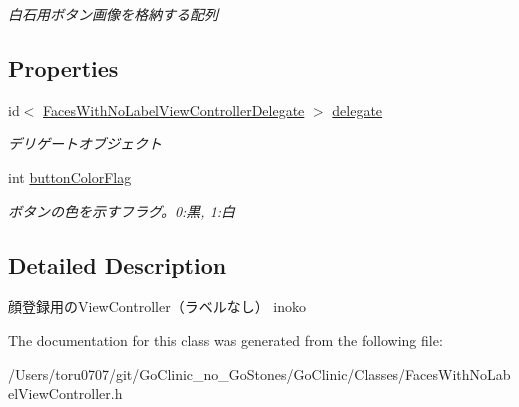 \begin{DoxyCompactItemize}
\begin{DoxyCompactList}\small\item\em 白石用ボタン画像を格納する配列 \end{DoxyCompactList}\end{DoxyCompactItemize}
\subsection*{Properties}
\begin{DoxyCompactItemize}
\item 
\hypertarget{interface_faces_with_no_label_view_controller_a7478381f8f326f2aed24674dfc976e2b}{
id$<$ \hyperlink{protocol_faces_with_no_label_view_controller_delegate-p}{FacesWithNoLabelViewControllerDelegate} $>$ \hyperlink{interface_faces_with_no_label_view_controller_a7478381f8f326f2aed24674dfc976e2b}{delegate}}
\label{interface_faces_with_no_label_view_controller_a7478381f8f326f2aed24674dfc976e2b}

\begin{DoxyCompactList}\small\item\em デリゲートオブジェクト \end{DoxyCompactList}\item 
\hypertarget{interface_faces_with_no_label_view_controller_af8b0053ebbad66d1c674fb2e6cfb28a6}{
int \hyperlink{interface_faces_with_no_label_view_controller_af8b0053ebbad66d1c674fb2e6cfb28a6}{buttonColorFlag}}
\label{interface_faces_with_no_label_view_controller_af8b0053ebbad66d1c674fb2e6cfb28a6}

\begin{DoxyCompactList}\small\item\em ボタンの色を示すフラグ。0:黒, 1:白 \end{DoxyCompactList}\end{DoxyCompactItemize}


\subsection{Detailed Description}
顔登録用のViewController（ラベルなし）  inoko 

The documentation for this class was generated from the following file:\begin{DoxyCompactItemize}
\item 
/Users/toru0707/git/GoClinic\_\-no\_\-GoStones/GoClinic/Classes/FacesWithNoLabelViewController.h\end{DoxyCompactItemize}
